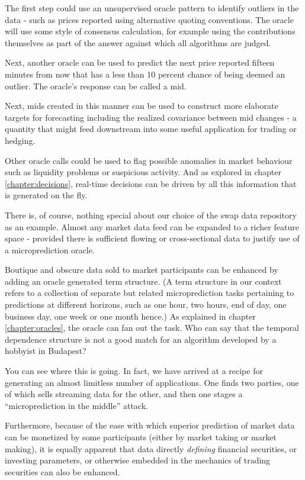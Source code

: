 The first step could use an unsupervised oracle pattern to identify outliers in the data - such as prices reported using alternative quoting conventions. The oracle will use some style of consensus calculation, for example using the contributions themselves as part of the answer against which all algorithms are judged. 

Next, another oracle can be used to predict the next price reported  fifteen minutes from now that has a less than 10 percent chance of being deemed an outlier. The oracle's response can be called a mid. 

Next, mids created in this manner can be used to construct more elaborate targets for forecasting including the realized covariance between mid changes - a quantity that might feed downstream into some useful application for trading or hedging.  

Other oracle calls could be used to flag possible anomalies in market behaviour such as liquidity problems or suspicious activity. And as explored in chapter \ref{chapter:decisions}, real-time decisions can be driven by all this information that is generated on the fly. 

There is, of course, nothing special about our choice of the swap data repository as an example. Almost any market data feed can be expanded to a richer feature space - provided there is sufficient flowing or cross-sectional data to justify use of a microprediction oracle. 

Boutique and obscure data sold to market participants can be enhanced by adding an oracle generated term structure. (A term structure in our context refers to a collection of separate but related microprediction tasks pertaining to predictions at different horizons, such as one hour, two hours, end of day, one business day, one week or one month hence.) As explained in chapter \ref{chapter:oracles}, the oracle can fan out the task. Who can say that the temporal dependence structure is not a good match for an algorithm developed by a hobbyist in Budapest? 

You can see where this is going. In fact, we have arrived at a recipe for generating an almost limitless number of applications. One finds two parties, one of which sells streaming data for the other, and then one stages a ``microprediction in the middle'' attack. 

Furthermore, because of the ease with which superior prediction of market data can be monetized by some participants (either by market taking or market making), it is equally apparent that data directly {\em defining} financial securities, or investing parameters, or otherwise embedded in the mechanics of trading securities can also be enhanced. 

